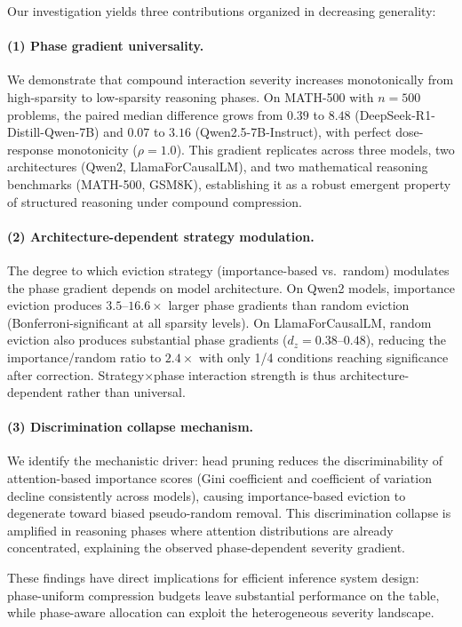 \documentclass[11pt,a4paper]{article}
\begin{document}
Our investigation yields three contributions organized in decreasing generality:

\paragraph{(1) Phase gradient universality.} We demonstrate that compound interaction severity increases monotonically from high-sparsity to low-sparsity reasoning phases. On MATH-500 with $n = 500$ problems, the paired median difference grows from $0.39$ to $8.48$ (DeepSeek-R1-Distill-Qwen-7B) and $0.07$ to $3.16$ (Qwen2.5-7B-Instruct), with perfect dose-response monotonicity ($\rho = 1.0$). This gradient replicates across three models, two architectures (Qwen2, LlamaForCausalLM), and two mathematical reasoning benchmarks (MATH-500, GSM8K), establishing it as a robust emergent property of structured reasoning under compound compression.

\paragraph{(2) Architecture-dependent strategy modulation.} The degree to which eviction strategy (importance-based vs.\ random) modulates the phase gradient depends on model architecture. On Qwen2 models, importance eviction produces $3.5$--$16.6\times$ larger phase gradients than random eviction (Bonferroni-significant at all sparsity levels). On LlamaForCausalLM, random eviction also produces substantial phase gradients ($d_z = 0.38$--$0.48$), reducing the importance/random ratio to $2.4\times$ with only 1/4 conditions reaching significance after correction. Strategy$\times$phase interaction strength is thus architecture-dependent rather than universal.

\paragraph{(3) Discrimination collapse mechanism.} We identify the mechanistic driver: head pruning reduces the discriminability of attention-based importance scores (Gini coefficient and coefficient of variation decline consistently across models), causing importance-based eviction to degenerate toward biased pseudo-random removal. This discrimination collapse is amplified in reasoning phases where attention distributions are already concentrated, explaining the observed phase-dependent severity gradient.

These findings have direct implications for efficient inference system design: phase-uniform compression budgets leave substantial performance on the table, while phase-aware allocation can exploit the heterogeneous severity landscape.
\end{document}
